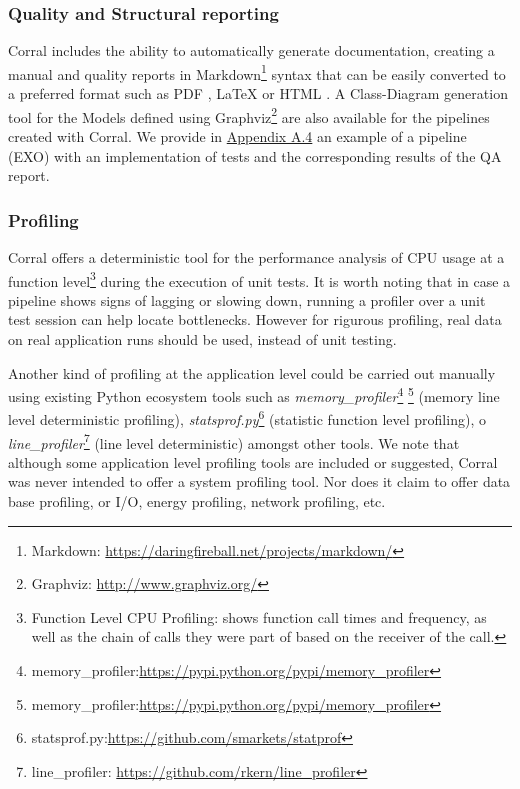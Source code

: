 \documentclass[final,5p,times,twocolumn,authoryear]{elsarticle}
\begin{document}
\subsubsection{Quality and Structural reporting}
%
Corral includes the ability to automatically
generate documentation, creating a manual and quality reports in
Markdown\footnote{Markdown: \url{https://daringfireball.net/projects/markdown/}}
syntax that can be easily converted to a preferred format such as
PDF \citep{iso2005document}, LaTeX \citep{lamport1994latex} or HTML \citep{priceiso}.
%
A Class-Diagram \citep{booch2006uml} generation tool for the
Models defined using Graphviz\footnote{Graphviz: \url{http://www.graphviz.org/}}
are also available for the pipelines created with Corral.
%
We provide in \hyperref[appendix_exo]{Appendix A.4} an example of a pipeline (EXO) with an implementation of tests and the corresponding results of the QA report.


\subsubsection{Profiling}
%
Corral offers a deterministic tool for the performance analysis
of CPU usage at a function level\footnote{Function Level CPU Profiling:
shows function call times and frequency, as
well as the chain of calls they were part of based on the receiver of the call.}
during the execution of unit tests.
%
It is worth noting that in case a pipeline shows signs of lagging or
slowing down, running a profiler over a unit test session can help locate bottlenecks.
However for rigurous profiling, real data on real application runs should
be used, instead of unit testing.
%

Another kind of profiling at the application level could be carried out
manually using existing Python ecosystem tools such as \textit{memory\_profiler}\footnote{memory\_profiler:\url{https://pypi.python.org/pypi/memory_profiler}}
\footnote{memory\_profiler:\url{https://pypi.python.org/pypi/memory_profiler}}
(memory line level deterministic profiling),
\textit{statsprof.py}\footnote{statsprof.py:\url{https://github.com/smarkets/statprof}}
(statistic function level profiling), o
\textit{line\_profiler}\footnote{line\_profiler: \url{https://github.com/rkern/line_profiler}}
(line level deterministic) amongst other tools.
%
We note that although some application level profiling tools are included or suggested, Corral was never intended to offer a system profiling tool. Nor does it claim to offer data base profiling, or I/O, energy profiling, network profiling, etc.
%
%
\end{document}
